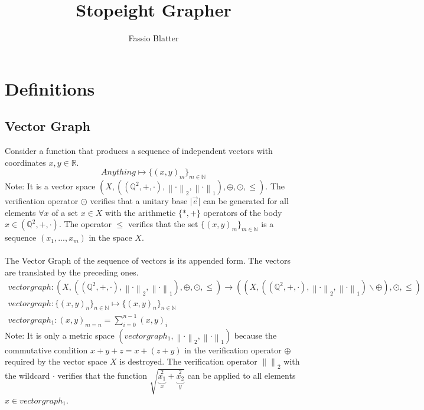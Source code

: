 \documentclass{report}
\newcommand\norm[1]{\left\lVert#1\right\rVert}
\begin{document}
\title{Stopeight Grapher}
\author{Fassio Blatter}
\maketitle

\chapter{Definitions}
\section{Vector Graph}
Consider a function that produces a sequence of independent vectors with coordinates $x,y \in \mathbb{R}$.
\begin{equation}
Anything \mapsto \{(x,y)_{m}\}_{m \in \mathbb{N}}
\end{equation}
Note: It is a vector space $(X,((\mathbb{Q}^2,+,\cdot),\norm{\cdot}_2,\norm{\cdot}_1),\oplus,\odot,\leq)$. The verification operator $\odot$ verifies that a unitary base $\lvert \overrightarrow{e} \rvert$ can be generated for all elements $\forall x$ of a set $x \in X$ with the arithmetic $\{*,+\}$ operators of the body $x \in (\mathbb{Q}^2,+,\cdot)$. The operator $\leq$ verifies that the set $\{(x,y)_{m}\}_{m \in \mathbb{N}}$ is a sequence $(x_{1},...,x_{m})$ in the space $X$.\\\\
The Vector Graph of the sequence of vectors is its appended form. The vectors are translated by the preceding ones.
\begin{align}
vectorgraph: (X,((\mathbb{Q}^2,+,\cdot),\norm{\cdot}_2,\norm{\cdot}_1),\oplus,\odot,\leq)\rightarrow ((X,((\mathbb{Q}^2,+,\cdot),\norm{\cdot}_2,\norm{\cdot}_1)\backslash\oplus),\odot,\leq)\\
vectorgraph: \{(x,y)_{n}\}_{n \in \mathbb{N}} \mapsto \{(x,y)_{n}\}_{n \in \mathbb{N}}\\
vectorgraph_{1}: (x,y)_{m=n}=\sum_{i=0}^{n-1} (x,y)_{i}
\end{align}
Note: It is only a metric space $(vectorgraph_{1},\norm{\cdot}_2,\norm{\cdot}_1)$ because the commutative condition $x+y+z=x+(z+y)$ in the verification operator $\oplus$ required by the vector space $X$ is destroyed. The verification operator $\norm{}_2$ with the wildcard $\cdot$ verifies that the function $\sqrt{\underbrace{x_{1}}_{x}^2+\underbrace{x_{2}}_{y}^2}$ can be applied to all elements $x \in vectorgraph_{1}$.
\end{document}
